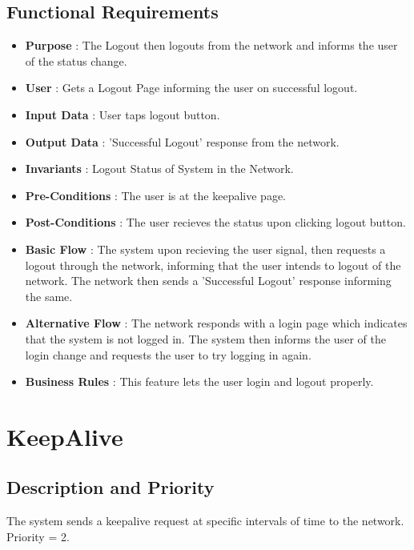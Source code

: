\subsection{Functional Requirements}

\begin{itemize}
\item \textbf{Purpose} : The Logout then logouts from the network and informs the user of the status change.
\item \textbf{User} : Gets a Logout Page informing the user on successful logout.
\item \textbf{Input Data} : User taps logout button.
\item \textbf{Output Data} : 'Successful Logout' response from the network.
\item \textbf{Invariants} : Logout Status of System in the Network.
\item \textbf{Pre-Conditions} : The user is at the keepalive page.
\item \textbf{Post-Conditions} : The user recieves the status upon clicking logout button.
\item \textbf{Basic Flow} : The system upon recieving the user signal, then requests a logout through the network, informing that the user intends to logout of the network. The network then sends a 'Successful Logout' response informing the same.
\item \textbf{Alternative Flow} : The network responds with a login page which indicates that the system is not logged in. The system then informs the user of the login change and requests the user to try logging in again.
\item \textbf{Business Rules} : This feature lets the user login and logout properly.
\end{itemize}
\section{KeepAlive}
\subsection{Description and Priority}
The system sends a keepalive request at specific intervals of time to the network.
Priority = 2.
